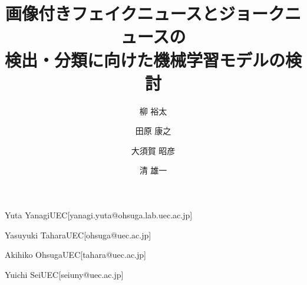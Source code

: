 \documentclass[submit,techrep,noauthor]{ipsj}
\begin{document}
\title{画像付きフェイクニュースとジョークニュースの\\
検出・分類に向けた機械学習モデルの検討}


\author{柳 裕太}{Yuta Yanagi}{UEC}[yanagi.yuta@ohsuga.lab.uec.ac.jp]
\author{田原 康之}{Yasuyuki Tahara}{UEC}[ohsuga@uec.ac.jp]
\author{大須賀 昭彦}{Akihiko Ohsuga}{UEC}[tahara@uec.ac.jp]
\author{清 雄一}{Yuichi Sei}{UEC}[seiuny@uec.ac.jp]



%
%
%

\maketitle












\end{document}
